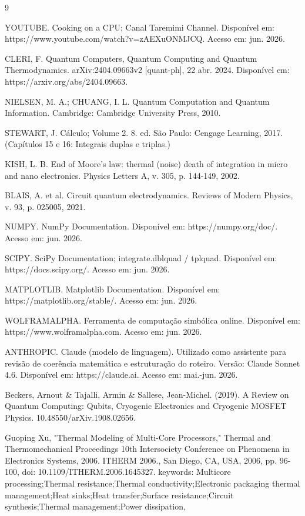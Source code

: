 \begin{thebibliography}{9}
   
YOUTUBE. Cooking on a CPU; Canal Taremimi Channel. Disponível em: https://www.youtube.com/watch?v=zAEXuONMJCQ. Acesso em: jun. 2026.

CLERI, F. Quantum Computers, Quantum Computing and Quantum Thermodynamics. arXiv:2404.09663v2 [quant-ph], 22 abr. 2024. Disponível em: https://arxiv.org/abs/2404.09663.

NIELSEN, M. A.; CHUANG, I. L. Quantum Computation and Quantum Information. Cambridge: Cambridge University Press, 2010.

STEWART, J. Cálculo; Volume 2. 8. ed. São Paulo: Cengage Learning, 2017. (Capítulos 15 e 16: Integrais duplas e triplas.)

KISH, L. B. End of Moore's law: thermal (noise) death of integration in micro and nano electronics. Physics Letters A, v. 305, p. 144-149, 2002.

BLAIS, A. et al. Circuit quantum electrodynamics. Reviews of Modern Physics, v. 93, p. 025005, 2021.

NUMPY. NumPy Documentation. Disponível em: https://numpy.org/doc/. Acesso em: jun. 2026.

SCIPY. SciPy Documentation; integrate.dblquad / tplquad. Disponível em: https://docs.scipy.org/. Acesso em: jun. 2026.

MATPLOTLIB. Matplotlib Documentation. Disponível em: https://matplotlib.org/stable/. Acesso em: jun. 2026.

WOLFRAMALPHA. Ferramenta de computação simbólica online. Disponível em: https://www.wolframalpha.com. Acesso em: jun. 2026.

ANTHROPIC. Claude (modelo de linguagem). Utilizado como assistente para revisão de coerência matemática e estruturação do roteiro. Versão: Claude Sonnet 4.6. Disponível em: https://claude.ai. Acesso em: mai.-jun. 2026.

Beckers, Arnout \& Tajalli, Armin \& Sallese, Jean-Michel. (2019). A Review on Quantum Computing: Qubits, Cryogenic Electronics and Cryogenic MOSFET Physics. 10.48550/arXiv.1908.02656. 

Guoping Xu, "Thermal Modeling of Multi-Core Processors," Thermal and Thermomechanical Proceedings 10th Intersociety Conference on Phenomena in Electronics Systems, 2006. ITHERM 2006., San Diego, CA, USA, 2006, pp. 96-100, doi: 10.1109/ITHERM.2006.1645327. keywords: {Multicore processing;Thermal resistance;Thermal conductivity;Electronic packaging thermal management;Heat sinks;Heat transfer;Surface resistance;Circuit synthesis;Thermal management;Power dissipation},

\end{thebibliography}